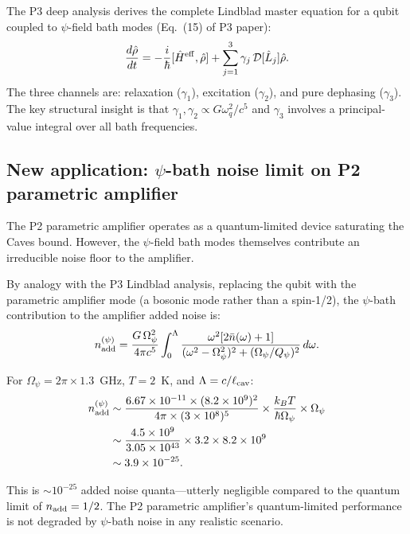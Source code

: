 \documentclass[11pt,twocolumn]{article}
\newcommand{\Opsi}{\Omega_\psi}
\begin{document}
The P3 deep analysis derives the complete Lindblad master equation
for a qubit coupled to $\psi$-field bath modes (Eq.~(15) of P3 paper):
\begin{equation}
\frac{d\hat{\rho}}{dt} = -\frac{i}{\hbar}[\hat{H}^{\rm eff}, \hat{\rho}]
+ \sum_{j=1}^3 \gamma_j\,\mathcal{D}[\hat{L}_j]\hat{\rho}.
\end{equation}
The three channels are: relaxation ($\gamma_1$), excitation ($\gamma_2$),
and pure dephasing ($\gamma_3$). The key structural insight is that
$\gamma_1, \gamma_2 \propto G \omega_q^2/c^5$ and $\gamma_3$ involves
a principal-value integral over all bath frequencies.

\subsection{New application: $\psi$-bath noise limit on P2 parametric amplifier}

The P2 parametric amplifier operates as a quantum-limited device
saturating the Caves bound. However, the $\psi$-field bath modes
themselves contribute an irreducible noise floor to the amplifier.

By analogy with the P3 Lindblad analysis, replacing the qubit with
the parametric amplifier mode (a bosonic mode rather than a spin-1/2),
the $\psi$-bath contribution to the amplifier added noise is:
\begin{equation}
n_{\rm add}^{(\psi)} = \frac{G\,\Opsi^2}{4\pi c^5}
\int_0^{\Lambda} \frac{\omega^2[2\bar{n}(\omega)+1]}
{(\omega^2 - \Opsi^2)^2 + (\Opsi/Q_\psi)^2}\,d\omega.
\label{eq:psi_bath_noise}
\end{equation}

For $\Opsi = 2\pi \times 1.3$~GHz, $T = 2$~K, and $\Lambda = c/\ell_{\rm cav}$:
\begin{align}
n_{\rm add}^{(\psi)} &\sim \frac{6.67\times10^{-11} \times (8.2\times10^9)^2}
{4\pi \times (3\times10^8)^5}
\times \frac{k_B T}{\hbar\Opsi} \times \Opsi
\nonumber\\
&\sim \frac{4.5\times10^{9}}{3.05\times10^{43}}
\times 3.2 \times 8.2\times10^{9}
\nonumber\\
&\sim 3.9\times10^{-25}.
\end{align}

This is $\sim 10^{-25}$ added noise quanta---utterly negligible
compared to the quantum limit of $n_{\rm add} = 1/2$. The P2
parametric amplifier's quantum-limited performance is not degraded
by $\psi$-bath noise in any realistic scenario.
\end{document}
